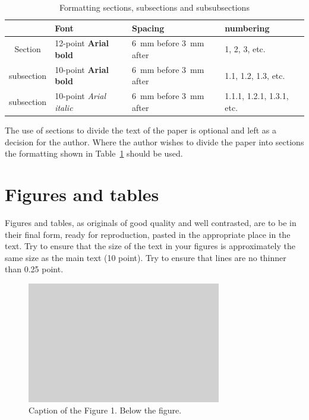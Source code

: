 \documentclass[twocolumn]{webofc}
\begin{document}
\begin{table}
  \centering
  \caption{Formatting sections, subsections and subsubsections}\label{tab:format-sec}
  \begin{tabular}{cp{16mm}p{18mm}p{17mm}}\toprule
             &Font &Spacing &numbering\\\midrule
    Section & 12-point \textbf{Arial bold} &6~mm before 3~mm after &1, 2, 3, etc.\\
    subsection & 10-point \textbf{Arial bold} &6~mm before 3~mm after &1.1, 1.2, 1.3, etc.\\
    subsection & 10-point \textit{Arial italic} &6~mm before 3~mm after &1.1.1, 1.2.1, 1.3.1, etc.\\
    \bottomrule
  \end{tabular}
\end{table}

The use of sections to divide the text of the paper is optional and left as a decision for the author.
Where the author wishes to divide the paper into sections the formatting shown in Table~\ref{tab:format-sec} should be used.

\section{Figures and tables}\label{sec:fig-tables}
Figures and tables, as originals of good quality and well contrasted, are to be in their final form, ready for reproduction, pasted in the appropriate place in the text.
Try to ensure that the size of the text in your figures is approximately the same size as the main text (10 point).
Try to ensure that lines are no thinner than 0.25 point. 

\begin{figure}
  \centering
  \includegraphics[width=\columnwidth]{grey-square}
  \caption{Caption of the Figure 1. Below the figure.}
\end{figure}
\end{document}
